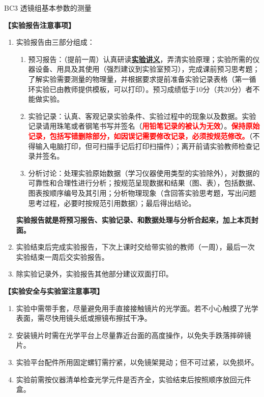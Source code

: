 \documentclass[dvipsnames, svgnames,a4paper,11pt]{article}
\begin{document}
\scoresTable{}{}{}{}{}{}{}{}

\infoTable{}{}{}{}{}{} %

\begin{center}
	\LARGE BC3 \quad 透镜组基本参数的测量
\end{center}

\textbf{【实验报告注意事项】}
\begin{enumerate}
	\item 实验报告由三部分组成：
	\begin{enumerate}
		\item 预习报告：（提前一周）认真研读\underline{\textbf{实验讲义}}，弄清实验原理；实验所需的仪器设备、用具及其使用（强烈建议到实验室预习），完成课前预习思考题；了解实验需要测量的物理量，并根据要求提前准备实验记录表格（第一循环实验已由教师提供模板，可以打印）。预习成绩低于10分（共20分）者不能做实验。
	    \item 实验记录：认真、客观记录实验条件、实验过程中的现象以及数据。实验记录请用珠笔或者钢笔书写并签名（\textcolor{red}{\textbf{用铅笔记录的被认为无效}}）。\textcolor{red}{\textbf{保持原始记录，包括写错删除部分，如因误记需要修改记录，必须按规范修改。}}（不得输入电脑打印，但可扫描手记后打印扫描件）；离开前请实验教师检查记录并签名。
	    \item 分析讨论：处理实验原始数据（学习仪器使用类型的实验除外），对数据的可靠性和合理性进行分析；按规范呈现数据和结果（图、表），包括数据、图表按顺序编号及其引用；分析物理现象（含回答实验思考题，写出问题思考过程，必要时按规范引用数据）；最后得出结论。
	\end{enumerate}
	\textbf{实验报告就是将预习报告、实验记录、和数据处理与分析合起来，加上本页封面。}
	\item 实验结束后完成实验报告，下次上课时交给带实验的教师（一周），最后一次实验结束一周后交实验报告。
	\item 除实验记录外，实验报告其他部分建议双面打印。
\end{enumerate}

\textbf{【实验安全与实验室注意事项】}
\begin{enumerate}
	\item 实验中需带手套，尽量避免用手直接接触镜片的光学面。若不小心触摸了光学表面，需尽快用镜头纸或擦镜布擦拭干净。
	\item 安装镜片时需在光学平台上尽量靠近台面的高度操作，以免失手跌落摔碎镜片。
	\item 实验平台配件所用固定螺钉需拧紧，以免镜架晃动；但不可过紧，以免损坏。
	\item 实验前需按仪器清单检查光学元件是否齐全，实验结束后按照顺序放回元件盒。
\end{enumerate}
\end{document}
